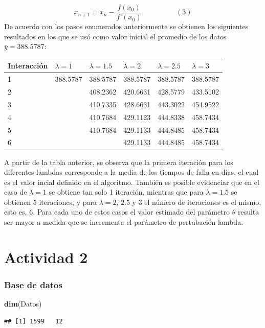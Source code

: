 \documentclass[
]{article}
\newenvironment{Shaded}{\begin{snugshade}}{\end{snugshade}}
\newcommand{\KeywordTok}[1]{\textcolor[rgb]{0.13,0.29,0.53}{\textbf{#1}}}
\newcommand{\NormalTok}[1]{#1}
\begin{document}
\[x_{n+1}=x_{n}-\frac{f(x_{0})}{f’(x_{0})} \hspace{2cm} (3)\] De acuerdo
con los pasos enumerados anteriormente se obtienen los siguientes
resultados en los que se usó como valor inicial el promedio de los datos
\(\bar{y}=388.5787\):

\begin{longtable}[]{@{}llllll@{}}
\toprule
Interacción & \(\lambda=1\) & \(\lambda=1.5\) & \(\lambda=2\) &
\(\lambda=2.5\) & \(\lambda=3\)\tabularnewline
\midrule
\endhead
1 & 388.5787 & 388.5787 & 388.5787 & 388.5787 & 388.5787\tabularnewline
2 & & 408.2362 & 420.6631 & 428.5779 & 433.5102\tabularnewline
3 & & 410.7335 & 428.6631 & 443.3022 & 454.9522\tabularnewline
4 & & 410.7684 & 429.1123 & 444.8338 & 458.7434\tabularnewline
5 & & 410.7684 & 429.1133 & 444.8485 & 458.7434\tabularnewline
6 & & & 429.1133 & 444.8485 & 458.7434\tabularnewline
\bottomrule
\end{longtable}

A partir de la tabla anterior, se observa que la primera iteración para
los diferentes lambdas corresponde a la media de los tiempos de falla en
días, el cual es el valor incial definido en el algoritmo. También es
posible evidenciar que en el caso de \(\lambda=1\) se obtiene tan solo 1
iteración, mientras que para \(\lambda=1.5\) se obtienen 5 iteraciones,
y para \(\lambda=2\), \(2.5\) y \(3\) el número de iteraciones es el
mismo, esto es, 6. Para cada uno de estos casos el valor estimado del
parámetro \(\theta\) resulta ser mayor a medida que se incrementa el
parámetro de pertubación lambda.

\hypertarget{actividad-2}{%
\section{Actividad 2}\label{actividad-2}}

\hypertarget{base-de-datos}{%
\subsubsection{Base de datos}\label{base-de-datos}}

\begin{Shaded}
\begin{Highlighting}[]
\KeywordTok{dim}\NormalTok{(Datos)}
\end{Highlighting}
\end{Shaded}

\begin{verbatim}
## [1] 1599   12
\end{verbatim}
\end{document}
